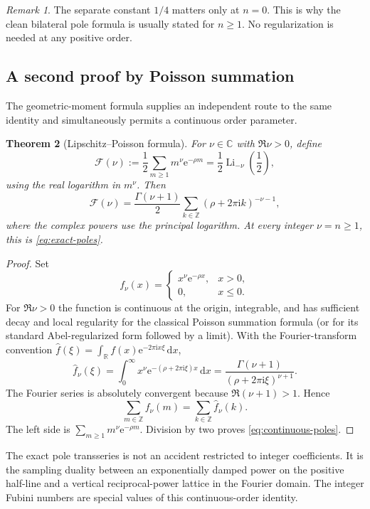 \documentclass[11pt,a4paper,oneside]{article}
\newtheorem{theorem}{Theorem}[section]
\theoremstyle{definition}
\theoremstyle{remark}
\newtheorem{remark}[theorem]{Remark}
\newcommand{\Li}{\operatorname{Li}}
\newcommand{\e}{\mathrm{e}}
\newcommand{\ii}{\mathrm{i}}
\newcommand{\dd}{\,\mathrm{d}}
\begin{document}
\begin{remark}
The separate constant $1/4$ matters only at $n=0$.  This is why the clean
bilateral pole formula is usually stated for $n\ge1$.  No regularization is
needed at any positive order.
\end{remark}

\subsection{A second proof by Poisson summation}
The geometric-moment formula supplies an independent route to the same
identity and simultaneously permits a continuous order parameter.

\begin{theorem}[Lipschitz--Poisson formula]\label{thm:poisson}
For $\nu\in\mathbb C$ with $\Re\nu>0$, define
\[
 \mathscr F(\nu):=\frac12\sum_{m\ge1}m^\nu\e^{-\rho m}
 =\frac12\Li_{-\nu}\!\left(\frac12\right),
\]
using the real logarithm in $m^\nu$.  Then
\begin{equation}\label{eq:continuous-poles}
 \mathscr F(\nu)
 =\frac{\Gamma(\nu+1)}{2}
  \sum_{k\in\mathbb Z}(\rho+2\pi\ii k)^{-\nu-1},
\end{equation}
where the complex powers use the principal logarithm.  At every integer
$\nu=n\ge1$, this is \cref{eq:exact-poles}.
\end{theorem}

\begin{proof}
Set
\[
 f_\nu(x)=\begin{cases}
 x^\nu\e^{-\rho x},&x>0,\\
 0,&x\le0.
 \end{cases}
\]
For $\Re\nu>0$ the function is continuous at the origin, integrable, and has
sufficient decay and local regularity for the classical Poisson summation
formula (or for its standard Abel-regularized form followed by a limit).  With
the Fourier-transform convention
\(
 \widehat f(\xi)=\int_{\mathbb R}f(x)\e^{-2\pi\ii x\xi}\dd x
\),
\[
 \widehat f_\nu(\xi)
 =\int_0^\infty x^\nu\e^{-(\rho+2\pi\ii\xi)x}\dd x
 =\frac{\Gamma(\nu+1)}{(\rho+2\pi\ii\xi)^{\nu+1}}.
\]
The Fourier series is absolutely convergent because
$\Re(\nu+1)>1$.  Hence
\[
 \sum_{m\in\mathbb Z}f_\nu(m)
 =\sum_{k\in\mathbb Z}\widehat f_\nu(k).
\]
The left side is $\sum_{m\ge1}m^\nu\e^{-\rho m}$.  Division by two proves
\cref{eq:continuous-poles}.
\end{proof}

\begin{interpretbox}
The exact pole transseries is not an accident restricted to integer
coefficients.  It is the sampling duality between an exponentially damped
power on the positive half-line and a vertical reciprocal-power lattice in
the Fourier domain.  The integer Fubini numbers are special values of this
continuous-order identity.
\end{interpretbox}
\end{document}
